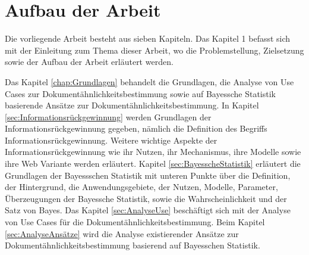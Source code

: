 \section{Aufbau der Arbeit}
\label{sec:Aufbau der Arbeit}


Die vorliegende Arbeit besteht aus sieben Kapiteln. Das Kapitel 1 befasst sich mit der Einleitung zum Thema dieser Arbeit, wo die Problemstellung, Zielsetzung sowie der Aufbau der Arbeit erläutert werden.
 
Das Kapitel \ref{chap:Grundlagen} behandelt die Grundlagen, die Analyse von Use Cases zur Dokumentähnlichkeitsbestimmung sowie auf Bayessche Statistik basierende Ansätze zur Dokumentähnlichkeitsbestimmung. In Kapitel \ref{sec:Informationsrückgewinnung} werden Grundlagen der Informationsrückgewinnung gegeben, nämlich die Definition des Begriffs Informationsrückgewinnung. Weitere wichtige Aspekte der Informationsrückgewinnung wie ihr Nutzen, ihr Mechanismus, ihre Modelle sowie ihre Web Variante werden erläutert. Kapitel \ref{sec:BayesscheStatistik} erläutert die Grundlagen der Bayessschen Statistik mit unteren Punkte über die Definition, der Hintergrund, die Anwendungsgebiete, der Nutzen, Modelle, Parameter, Überzeugungen der Bayessche Statistik, sowie die Wahrscheinlichkeit und der Satz von Bayes. Das Kapitel \ref{sec:AnalyseUse} beschäftigt sich mit der Analyse von Use Cases für die Dokumentähnlichkeitsbestimmung. Beim Kapitel \ref{sec:AnalyseAnsätze} wird die Analyse existierender Ansätze zur Dokumentähnlichkeitsbestimmung basierend auf Bayesschen Statistik.


